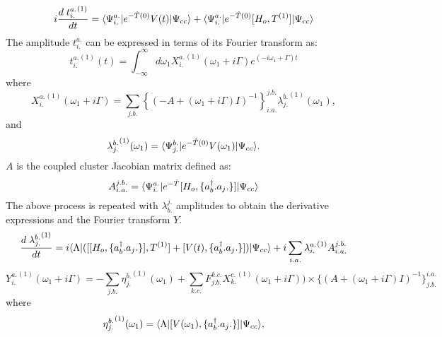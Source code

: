 \begin{equation}
i\frac{d\;{t^{a.}_{i.}}^{(1)}}{dt} = \langle \Psi^{a.}_{i.} |e^{-\hat{T}(0)}V(t)| \Psi_{cc} \rangle + \langle \Psi^{a.}_{i.} |e^{-\hat{T}(0)}\lbrack H_o,T^{(1)}\rbrack| \Psi_{cc} \rangle
\end{equation}
The amplitude $t^{a.}_{i.}$ can be expressed in terms of its Fourier transform as: 
\begin{equation}
{t^{a.}_{i.}}^{(1)}(t) = \int_{-\infty}^{\infty} d\omega_1{X^{a.}_{i.}}^{(1)}(\omega_1 + i\Gamma)e^{(-i\omega_1 + \Gamma) t}
\end{equation}
where
\begin{equation}
{X^{a.}_{i.}}^{(1)}(\omega_1 + i\Gamma)  = \sum_{j.b.}{\left\{{(-A + (\omega_1 + i \Gamma) I )}^{-1}\right\}}^{j.b.}_{i.a.}{\lambda^{b.}_{j.}}^{(1)}(\omega_1),
\end{equation}
and  
\begin{equation}
{\lambda^{b.}_{j.}}^{(1)}(\omega_1) = \langle \Psi^{b.}_{j.} |e^{-\hat{T}(0)}V(\omega_1)| \Psi_{cc} \rangle.
\end{equation}
$A$ is the coupled cluster Jacobian matrix defined as:
\begin{equation}
A^{j.b.}_{i.a.} = \langle \Psi^{a.}_{i.} |e^{-\hat{T}}\lbrack H_o,\{{a}^\dagger_b.a_j.\}\rbrack| \Psi_{cc} \rangle
\end{equation}
The above process is repeated with $\lambda^{j.}_{b.}$ amplitudes to obtain the derivative expressions and the Fourier transform $Y$.
\begin{equation}
\frac{d\;{\lambda^{b.}_{j.}}^{(1)}}{dt} = i\langle \Lambda |(\lbrack\lbrack H_o,\{{a}^\dagger_b.a_j.\}\rbrack,T^{(1)}\rbrack + \lbrack V(t),\{{a}^\dagger_b.a_j.\}\rbrack)| \Psi_{cc} \rangle + i\sum_{i.a.} {\lambda^{a.}_{i.}}^{(1)}A^{j.b.}_{i.a.} 
\end{equation}
\begin{equation} 
{Y^{a.}_{i.}}^{(1)}(\omega_1 + i\Gamma) = - \sum_{j.b.}{\eta^{b.}_{j.}}^{(1)}(\omega_1) + \sum_{k.c.}F^{k.c.}_{j.b.} {X^{c.}_{k.}}^{(1)}(\omega_1 + i\Gamma)) \times\{{(A + (\omega_1 + i\Gamma)I)}^{-1}\}^{i.a.}_{j.b.}
\end{equation}
where
\begin{equation}
{\eta^{b.}_{j.}}^{(1)}(\omega_1) = \langle \Lambda |\lbrack V(\omega_1),\{{a}^\dagger_b.a_j.\}\rbrack| \Psi_{cc} \rangle ,
\end{equation}
